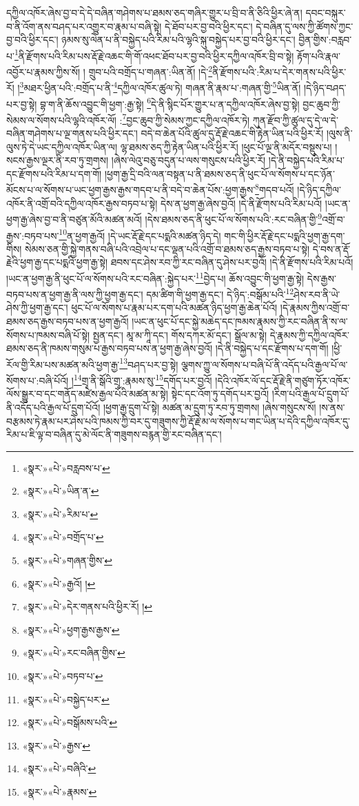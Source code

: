 དཀྱིལ་འཁོར་ཞེས་བྱ་བ་དེ་དེ་བཞིན་གཤེགས་པ་ཐམས་ཅད་གཞིར་གྱུར་པ་བྲི་བ་ནི་ཅིའི་ཕྱིར་ཞེ་ན། དབང་བསྐུར་བ་ནི་འོག་ནས་བཤད་པར་འགྱུར་བ་རྣམ་པ་བཞི་སྟེ། དེ་ཐོབ་པར་བྱ་བའི་ཕྱིར་དང་། དེ་བཞིན་དུ་ལས་ཀྱི་ཚོགས་ཀྱང་བྱ་བའི་ཕྱིར་དང་། ཉམས་སུ་ལེན་པ་ནི་བསྐྱེད་པའི་རིམ་པའི་ལྷའི་སྐུ་བསྐྱེད་པར་བྱ་བའི་ཕྱིར་དང་། བྱིན་གྱིས་:བརླབ་པ་\footnote{«སྣར་»«པེ་»བརླབས་པ་}ནི་རྫོགས་པའི་རིམ་པས་རྡོ་རྗེ་འཆང་གི་གོ་འཕང་ཐོབ་པར་བྱ་བའི་ཕྱིར་དཀྱིལ་འཁོར་བྲི་བ་སྟེ། རྟོག་པའི་རྣལ་འབྱོར་པ་རྣམས་ཀྱིས་སོ། །
གྲུབ་པའི་བགྲོད་པ་གཞན་:ཡིན་ནོ། །དེ་\footnote{«སྣར་»«པེ་»ཡིན་ན་}ནི་རྫོགས་པའི་:རིམ་པ་དེར་གནས་པའི་ཕྱིར་རོ། །\footnote{«སྣར་»«པེ་»རིམ་པ་}མཐར་ཕྱིན་པའི་:བགྲོད་པ་ནི་\footnote{«སྣར་»«པེ་»བགྲོད་པ་}དཀྱིལ་འཁོར་ཚུལ་ཏེ། གཞན་ནི་རྣམ་པ་:གཞན་གྱི་\footnote{«སྣར་»«པེ་»གཞན་གྱིས་}ཡིན་ནོ། །དེ་ཉིད་བཤད་པར་བྱ་སྟེ། བྷ་ག་ནི་ཆོས་འབྱུང་གི་ཕྱག་:རྒྱ་སྟེ། \footnote{«སྣར་»«པེ་»རྒྱའོ། ། }དེ་ནི་སྙིང་པོར་གྱུར་པ་ན་དཀྱིལ་འཁོར་ཞེས་བྱ་སྟེ། བྱང་ཆུབ་ཀྱི་སེམས་ལ་སོགས་པའི་ལྷའི་འཁོར་ལོ། :\footnote{«སྣར་»«པེ་»དེར་གནས་པའི་ཕྱིར་རོ། །}བྱང་ཆུབ་ཀྱི་སེམས་ཀྱང་དཀྱིལ་འཁོར་ཏེ། ཀུན་རྫོབ་ཀྱི་ཚུལ་དུ་དེ་ལ་དེ་བཞིན་གཤེགས་པ་ལྔ་གནས་པའི་ཕྱིར་དང་། བདེ་བ་ཆེན་པོའི་ཚུལ་དུ་རྡོ་རྗེ་འཆང་གི་རྟེན་ཡིན་པའི་ཕྱིར་རོ། །ལུས་ནི་ལུས་ཏེ་དེ་ཡང་དཀྱིལ་འཁོར་ཡིན་ལ། ལྷ་ཐམས་ཅད་ཀྱི་རྟེན་ཡིན་པའི་ཕྱིར་རོ། །ཕུང་པོ་ལྔ་ནི་མདོར་བསྡུས་པ། །སངས་རྒྱས་ལྔར་ནི་རབ་ཏུ་གྲགས། །ཞེས་ལེའུ་བཅུ་བདུན་པ་ལས་གསུངས་པའི་ཕྱིར་རོ། །དེ་ནི་བསྐྱེད་པའི་རིམ་པ་དང་རྫོགས་པའི་རིམ་པ་དག་གོ། །ཕྱག་རྒྱ་དྲི་བའི་ལན་བསྟན་པ་ནི་ཐམས་ཅད་ནི་ཕུང་པོ་ལ་སོགས་པ་དང་ཉོན་མོངས་པ་ལ་སོགས་པ་ཡང་ཕྱག་རྒྱས་རྒྱས་གདབ་པ་ནི་བདེ་བ་ཆེན་པོས་:ཕྱག་རྒྱས་\footnote{«སྣར་»«པེ་»ཕྱག་རྒྱས་རྒྱས་}གདབ་པའོ། །དེ་ཉིད་དཀྱིལ་འཁོར་ནི་འགྲོ་བའི་དཀྱིལ་འཁོར་རྒྱས་བཏབ་པ་སྟེ། དེས་ན་ཕྱག་རྒྱ་ཞེས་བྱའོ། །དེ་ནི་རྫོགས་པའི་རིམ་པའོ། །ཡང་ན་ཕྱག་རྒྱ་ཞེས་བྱ་བ་ནི་བཙུན་མོའི་མཚན་མའོ། །དེས་ཐམས་ཅད་ནི་ཕུང་པོ་ལ་སོགས་པའི་:རང་བཞིན་གྱི་\footnote{«སྣར་»«པེ་»རང་བཞིན་གྱིས་}འགྲོ་བ་རྒྱས་:བཏབ་པས་\footnote{«སྣར་»«པེ་»བཏབ་པ་}ན་ཕྱག་རྒྱའོ། །དེ་ཡང་རྡོ་རྗེ་དང་པདྨའི་མཚན་ཉིད་དེ། གང་གི་ཕྱིར་རྡོ་རྗེ་དང་པདྨའི་ཕྱག་རྒྱ་དག་གིས། སེམས་ཅན་གྱི་སྐྱེ་གནས་བཞི་པའི་འབྲེལ་པ་དང་ལྡན་པའི་འགྲོ་བ་ཐམས་ཅད་རྒྱས་བཏབ་པ་སྟེ། དེ་བས་ན་རྡོ་རྗེའི་ཕྱག་རྒྱ་དང་པདྨའི་ཕྱག་རྒྱ་སྟེ། ཐབས་དང་ཤེས་རབ་ཀྱི་རང་བཞིན་དུ་ཤེས་པར་བྱའོ། །དེ་ནི་རྫོགས་པའི་རིམ་པའོ། །ཡང་ན་ཕྱག་རྒྱ་ནི་ཕུང་པོ་ལ་སོགས་པའི་རང་བཞིན་:སྐྱེད་པར་\footnote{«སྣར་»«པེ་»བསྐྱེད་པར་}བྱེད་པ། ཆོས་འབྱུང་གི་ཕྱག་རྒྱ་སྟེ། དེས་རྒྱས་བཏབ་པས་ན་ཕྱག་རྒྱ་ནི་ལས་ཀྱི་ཕྱག་རྒྱ་དང་། དམ་ཚིག་གི་ཕྱག་རྒྱ་དང་། དེ་ཉིད་:བསྒོམ་པའི་\footnote{«སྣར་»«པེ་»བསྒོམས་པའི་}ཤེས་རབ་ནི་ཡེ་ཤེས་ཀྱི་ཕྱག་རྒྱ་དང་། ཕུང་པོ་ལ་སོགས་པ་རྣམ་པར་དག་པའི་མཚན་ཉིད་ཕྱག་རྒྱ་ཆེན་པོའོ། །དེ་རྣམས་ཀྱིས་འགྲོ་བ་ཐམས་ཅད་རྒྱས་བཏབ་པས་ན་ཕྱག་རྒྱའོ། །ཡང་ན་ཕུང་པོ་དང་སྐྱེ་མཆེད་དང་ཁམས་རྣམས་ཀྱི་རང་བཞིན་ནི་ས་ལ་སོགས་པ་ཁམས་བཞི་པོ་སྟེ། སྤྱན་དང་། མཱ་མ་ཀཱི་དང་། གོས་དཀར་མོ་དང་། སྒྲོལ་མ་སྟེ། དེ་རྣམས་ཀྱི་དཀྱིལ་འཁོར་ཐམས་ཅད་ནི་ཁམས་གསུམ་པ་རྒྱས་བཏབ་པས་ན་ཕྱག་རྒྱ་ཞེས་བྱའོ། །དེ་ནི་བསྐྱེད་པ་དང་རྫོགས་པ་དག་གོ། །ཕྱི་རོལ་གྱི་རིམ་པས་མཚན་མའི་ཕྱག་རྒྱ་\footnote{«སྣར་»«པེ་»རྒྱས་}བཤད་པར་བྱ་སྟེ། ལྕགས་ཀྱུ་ལ་སོགས་པ་བཞི་པོ་ནི་འདོད་པའི་རྒྱལ་པོ་ལ་སོགས་པ་:བཞི་པོའོ། །\footnote{«སྣར་»«པེ་»བཞིའི་}གྲྭ་ནི་སྒོའི་གྲྭ་:རྣམས་སུ་\footnote{«སྣར་»«པེ་»རྣམས་}དགོད་པར་བྱའོ། །དེའི་འཁོར་ལོ་དང་རྡོ་རྗེ་ནི་གཙུག་ཏོར་འཁོར་ལོས་སྒྱུར་བ་དང་གནོད་མཛེས་རྒྱལ་པོའི་མཚན་མ་སྟེ། སྟེང་དང་འོག་ཏུ་དགོད་པར་བྱའོ། །རིག་པའི་རྒྱལ་པོ་དྲུག་པོ་ནི་འདོད་པའི་རྒྱལ་པོ་དྲུག་པོའོ། །ཕྱག་རྒྱ་དྲུག་པོ་སྟེ། མཚན་མ་དྲུག་ཏུ་རབ་ཏུ་གྲགས། །ཞེས་གསུངས་སོ། །ས་ནས་བརྩམས་ཏེ་རྣམ་པར་ཤེས་པའི་ཁམས་ཀྱི་བར་དུ་གཟུགས་ཀྱི་རྡོ་རྗེ་མ་ལ་སོགས་པ་གང་ཡིན་པ་དེའི་དཀྱིལ་འཁོར་དུ་རིམ་པ་ཇི་ལྟ་བ་བཞིན་དུ་མེ་ལོང་ནི་གཟུགས་བརྙན་གྱི་རང་བཞིན་དང་། 